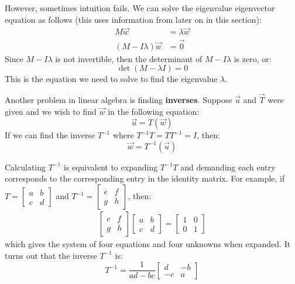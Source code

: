 \documentclass{article}
\let\oldtextbf\textbf
\renewcommand{\textbf}[1]{\oldtextbf{#1}\index{#1}}
\begin{document}
\begin{idea}
    However, sometimes intuition fails. We can solve the eigenvalue eigenvector equation as follows (this uses information from later on in this section):
\begin{align}
    M\vec{w} &= \lambda\vec{w} \\ 
    (M-I\lambda)\vec{w} &= \vec{0}
\end{align}
Since $M-I\lambda$ is not invertible, then the determinant of $M-I\lambda$ is zero, or:
\begin{equation}
    \det(M-\lambda I)=0
\end{equation}
This is the equation we need to solve to find the eigenvalue $\lambda$.
\end{idea}

Another problem in linear algebra is finding \textbf{inverses}. Suppose $\vec{u}$ and $\vec{T}$ were given and we wish to find $\vec{w}$ in the following equation:
\begin{equation}
    \vec{u}=T(\vec{w})
\end{equation}
If we can find the inverse $T^{-1}$ where $T^{-1}T=TT^{-1}=I$, then:
\begin{equation}
    \vec{w}=T^{-1}(\vec{u})
    \label{eq:}
\end{equation}
\begin{idea}
    Calculating $T^{-1}$ is equivalent to expanding $T^{-1}T$ and demanding each entry corresponds to the corresponding entry in the identity matrix. For example, if $T=\begin{bmatrix}
        a&b\\c&d
    \end{bmatrix}$ and $T^{-1}=\begin{bmatrix}
        e&f\\g&h
    \end{bmatrix}$, then:
    \begin{align}
        \begin{bmatrix}
            e&f\\g&h
        \end{bmatrix}\begin{bmatrix}
            a&b\\c&d
        \end{bmatrix} = \begin{bmatrix}
            1&0\\0&1
        \end{bmatrix}
    \end{align}
    which gives the system of four equations and four unknowns when expanded. It turns out that the inverse $T^{-1}$ is:
    \begin{equation}
        T^{-1} = \frac{1}{ad-bc}\begin{bmatrix}
            d&-b\\-c&a
        \end{bmatrix}
        \label{eq:}
    \end{equation}
\end{idea}
\end{document}
